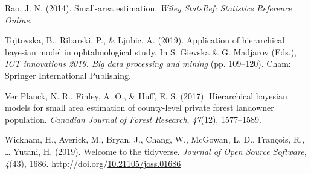 \documentclass[12pt,twoside]{reedthesis}
\newlength{\cslhangindent}
\newenvironment{CSLReferences}[2] %
 {%
  \setlength{\parindent}{0pt}
  \ifodd #1 \everypar{\setlength{\hangindent}{\cslhangindent}}\ignorespaces\fi
  \ifnum #2 > 0
  \setlength{\parskip}{#2\baselineskip}
  \fi
 }%
 {}
\begin{document}
\begin{CSLReferences}{1}{0}
\leavevmode{}%
Rao, J. N. (2014). Small-area estimation. \emph{Wiley StatsRef: Statistics Reference Online}.

\leavevmode{}%
Tojtovska, B., Ribarski, P., \& Ljubic, A. (2019). Application of hierarchical bayesian model in ophtalmological study. In S. Gievska \& G. Madjarov (Eds.), \emph{ICT innovations 2019. Big data processing and mining} (pp. 109--120). Cham: Springer International Publishing.

\leavevmode{}%
Ver Planck, N. R., Finley, A. O., \& Huff, E. S. (2017). Hierarchical bayesian models for small area estimation of county-level private forest landowner population. \emph{Canadian Journal of Forest Research}, \emph{47}(12), 1577--1589.

\leavevmode{}%
Wickham, H., Averick, M., Bryan, J., Chang, W., McGowan, L. D., François, R., \ldots{} Yutani, H. (2019). Welcome to the {tidyverse}. \emph{Journal of Open Source Software}, \emph{4}(43), 1686. http://doi.org/\href{https://doi.org/10.21105/joss.01686}{10.21105/joss.01686}

\end{CSLReferences}

\end{document}
